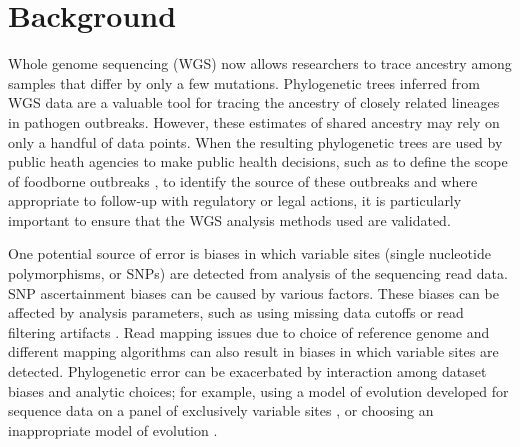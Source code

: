 \documentclass{bmcart}
\begin{document}



\section*{Background}
Whole genome sequencing (WGS) now allows researchers to trace ancestry among samples that differ by only a few mutations.
Phylogenetic trees inferred from WGS data are a valuable tool for tracing the ancestry of closely related lineages in pathogen outbreaks.
However, these estimates of shared ancestry may rely on only a handful of data points.
When the resulting phylogenetic trees are used by public heath agencies to make public health decisions, such as to define the scope of foodborne outbreaks \cite{jackson_implementation_2016},
to identify the source of these outbreaks \cite{hoffmann_tracing_2015,dallman_phylogenetic_2016, allard_practical_2016} and where appropriate to follow-up with regulatory or legal actions, it is particularly important to ensure that the WGS analysis methods used are validated.

One potential source of error is biases in which variable sites (single nucleotide polymorphisms, or SNPs)
are detected from analysis of the sequencing read data. SNP ascertainment biases can be caused by various factors.
These biases can be affected by analysis parameters, such as using missing data cutoffs \cite{huang_unforeseen_2014} or read filtering artifacts \cite{li_toward_2014}.
Read mapping issues due to choice of reference genome \cite{bertels_automated_2014} and different mapping algorithms \cite{pightling_choice_2014} can also result in biases in which variable sites are detected.
Phylogenetic error can be exacerbated by interaction among dataset biases and analytic choices;
for example, using a model of evolution developed for sequence data on a panel of exclusively variable sites \cite{lewis_likelihood_2001}, or choosing an inappropriate model of evolution \cite{sullivan_are_1997}.
\end{document}
